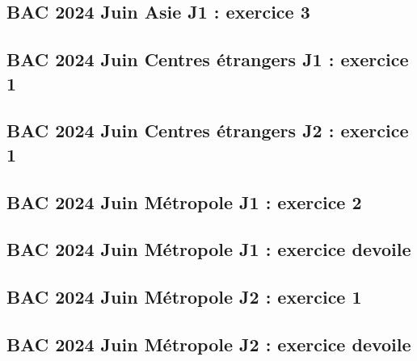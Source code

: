 \documentclass[lang=fr,edition=teacher,layout=sheet]{mxbook}
\begin{document}
\begingroup\endgroup
\par\bigskip
{}\subsection*{BAC 2024 Juin Asie J1 : exercice 3}
\begingroup\endgroup
\par\bigskip
{}\subsection*{BAC 2024 Juin Centres étrangers J1 : exercice 1}
\begingroup\endgroup
\par\bigskip
{}\subsection*{BAC 2024 Juin Centres étrangers J2 : exercice 1}
\begingroup\endgroup
\par\bigskip
{}\subsection*{BAC 2024 Juin Métropole J1 : exercice 2}
\begingroup\endgroup
\par\bigskip
{}\subsection*{BAC 2024 Juin Métropole J1 : exercice devoile}
\begingroup\endgroup
\par\bigskip
{}\subsection*{BAC 2024 Juin Métropole J2 : exercice 1}
\begingroup\endgroup
\par\bigskip
{}\subsection*{BAC 2024 Juin Métropole J2 : exercice devoile}
\end{document}
